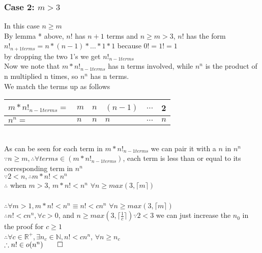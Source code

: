 \documentclass{article}
\begin{document}
          \subsubsection{Case 2: $m > 3$}
            In this case $n \geq m$ \\
            By lemma * above, $n!$ has $n + 1$ terms and $n \geq m > 3$, $n!$ has the form $n!_{n+1 terms} = n * (n - 1) * \dots * 1 * 1$ because $0! = 1! = 1$ \\
            by dropping the two 1's we get $n!_{n-1 terms}$ \\
            Now we note that $m * n!_{n-1 terms}$ has n terms involved, while $n^{n}$ is the product of n multiplied n times, so $n^{n}$ has n terms. \\
            We match the terms up as follows \\
            \begin{table}[h]
              \begin{tabular}{|l|l|l|l|l|l|}
                \hline
                $m * n!_{n-1 terms} =$ & $m$ & $n$  & $(n - 1)$ & $\dots$  & 2 \\ \hline
                $n^{n} =$              & $n$ & $n$  & $n$       & $\dots$  & $n$    \\ \hline
              \end{tabular}
            \end{table} \\
            As can be seen for each term in $m * n!_{n-1 terms}$ we can pair it with a $n$ in $n^{n}$ \\
            $\because n \geq m, \therefore \forall terms \in (m * n!_{n-1 terms})$, each term is less than or equal to its corresponding term in $n^{n}$ \\
            $\because 2 < n, \therefore m * n! < n^{n}$ \\
            $\therefore$ when $m > 3$, $m * n! < n^{n}$  $\forall n \geq max(3,\lceil m \rceil)$ \\
            \\
            $\therefore \forall m > 1, m * n! < n^{n} \equiv n! < cn^{n}$  $\forall n \geq max(3,\lceil m \rceil)$ \\
            $\therefore n! < cn^{n}, \forall c > 0$, and $n \geq max(3,\lceil \frac{1}{c} \rceil) \because 2 < 3$ we can just increase the $n_{0}$ in the proof for $c \geq 1$ \\
            $\therefore \forall c \in \mathbb{R}^{+}, \exists n_{c} \in \mathbb{N}, n! < cn^{n}$, $\forall n \geq n_{c}$ \\
            $\therefore n! \in o(n^{n}) \qed$
\end{document}
